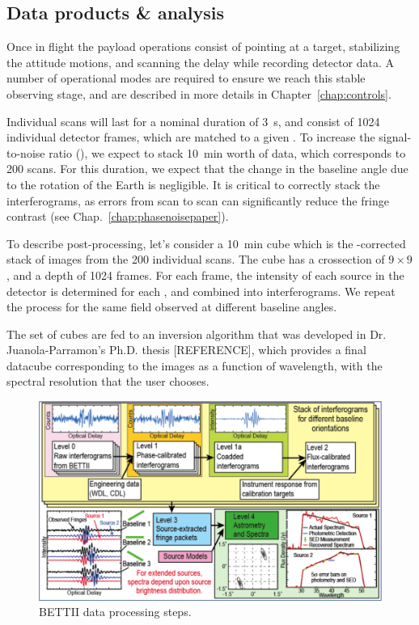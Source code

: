 \subsection{Data products \& analysis}


Once in flight the payload operations consist of pointing at a target, stabilizing the attitude motions, and scanning the delay while recording detector data. A number of operational modes are required to ensure we reach this stable observing stage, and are described in more details in Chapter~\ref{chap:controls}. 

Individual scans will last for a nominal duration of \SI{3}{\second}, and consist of \si{1024} individual detector frames, which are matched to a given \OPD. To increase the signal-to-noise ratio (\SNR), we expect to stack \SI{10}{\minute} worth of data, which corresponds to 200 scans. For this duration, we expect that the change in the baseline angle due to the rotation of the Earth is negligible. It is critical to correctly stack the interferograms, as \OPD errors from scan to scan can significantly reduce the fringe contrast (see Chap.~\ref{chap:phasenoisepaper}).

To describe post-processing, let's consider a \SI{10}{\minute} cube which is the {\OPD}-corrected stack of images from the 200 individual scans. The cube has a crossection of $9\times 9$, and a depth of 1024 frames. For each frame, the intensity of each source in the detector is determined for each \OPD, and combined into interferograms. We repeat the process for the same field observed at different baseline angles. 

The set of cubes are fed to an inversion algorithm that was developed in Dr. Juanola-Parramon's Ph.D. thesis [REFERENCE], which provides a final datacube corresponding to the images as a function of wavelength, with the spectral resolution that the user chooses. 

\begin{figure}[!h]
	\centering
	\includegraphics[width=\textwidth]{Figures/DataProcessing.png}
	\caption[Data processing]{BETTII data processing steps.}
	\label{fig:dataProcessing}
    \end{figure}




